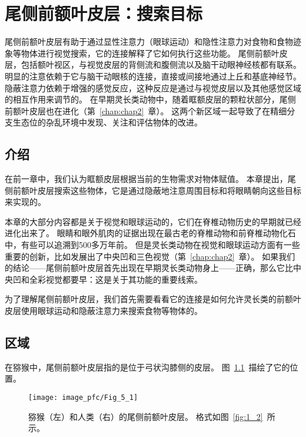 \chapter{尾侧前额叶皮层：搜索目标} \label{chap:chap5}

尾侧前额叶皮层有助于通过显性注意力（眼球运动）和隐性注意力对食物和食物迹象等物体进行视觉搜索，它的连接解释了它如何执行这些功能。
尾侧前额叶皮层，包括额叶视区，与视觉皮层的背侧流和腹侧流以及脑干动眼神经核都有联系。
明显的注意依赖于它与脑干动眼核的连接，直接或间接地通过上丘和基底神经节。
隐蔽注意力依赖于增强的感觉反应，这种反应是通过与视觉皮层以及其他感觉区域的相互作用来调节的。
在早期灵长类动物中，随着眶额皮层的颗粒状部分，尾侧前额叶皮层也在进化（第~\ref{chap:chap2}~章）。
这两个新区域一起导致了在精细分支生态位的杂乱环境中发现、关注和评估物体的改进。



\section{介绍}

在前一章中，我们认为眶额皮层根据当前的生物需求对物体赋值。
本章提出，尾侧前额叶皮层搜索这些物体，它是通过隐蔽地注意周围目标和将眼睛朝向这些目标来实现的。


本章的大部分内容都是关于视觉和眼球运动的，它们在脊椎动物历史的早期就已经进化出来了。
眼睛和眼外肌肉的证据出现在最古老的脊椎动物和前脊椎动物化石中，有些可以追溯到500多万年前\cite{shu2003head}。
但是灵长类动物在视觉和眼球运动方面有一些重要的创新，比如发展出了中央凹和三色视觉（第~\ref{chap:chap2}~章）。
如果我们的结论——尾侧前额叶皮层首先出现在早期灵长类动物身上——正确，那么它比中央凹和全彩视觉都要早：这是关于其功能的重要线索。


为了理解尾侧前额叶皮层，我们首先需要看看它的连接是如何允许灵长类的前额叶皮层使用眼球运动和隐蔽注意力来搜索食物等物体的。



\section{区域}

在猕猴中，尾侧前额叶皮层指的是位于弓状沟膝侧的皮层。
图~\ref{fig:fig_5_1}~描绘了它的位置。


\begin{figure}
	\centering
	\texttt{[image: image\_pfc/Fig\_5\_1]}
	\caption{猕猴（左）和人类（右）的尾侧前额叶皮层。
		格式如图~\ref{fig:1_2}~所示。}
	\label{fig:fig_5_1}
\end{figure}


